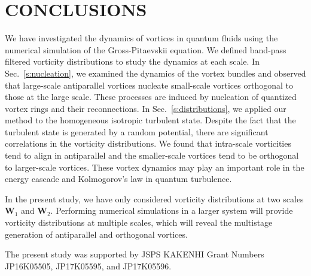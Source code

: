 \documentclass[aps,onecolumn,pra,longbibliography]{revtex4}
\begin{document}
	\section{CONCLUSIONS}
	\label{s:conclusions}
	We have investigated the dynamics of vortices in quantum fluids
	using the numerical simulation of the Gross-Pitaevskii equation.
	We defined band-pass filtered vorticity distributions to study the
	dynamics at each scale.
	In Sec.~\ref{s:nucleation},
	we examined the dynamics of the vortex bundles
	and observed that large-scale antiparallel vortices nucleate
	small-scale vortices orthogonal to those at the large scale.
	These processes are induced by nucleation of quantized vortex rings
	and their reconnections.
	In Sec.~\ref{s:distributions},
	we applied our method to
	the homogeneous isotropic turbulent state.
	Despite the fact that the turbulent state is generated by a random potential,
	there are significant correlations in the vorticity distributions.
	We found that intra-scale vorticities tend to align in antiparallel
	and the smaller-scale vortices tend to be orthogonal to larger-scale vortices.
	These vortex dynamics may play an important role
	in the energy cascade and Kolmogorov's law in quantum turbulence.


	In the present study, we have only considered vorticity distributions
	at two scales $\bm{W}_1$ and $\bm{W}_2$.
	Performing numerical simulations in a larger system will provide
	vorticity distributions at multiple scales, which will reveal the multistage
	generation of antiparallel and orthogonal vortices.

	\begin{acknowledgments}
		The present study was supported by
		JSPS KAKENHI Grant Numbers JP16K05505, JP17K05595, and JP17K05596.
	\end{acknowledgments}

	\appendix
\end{document}

